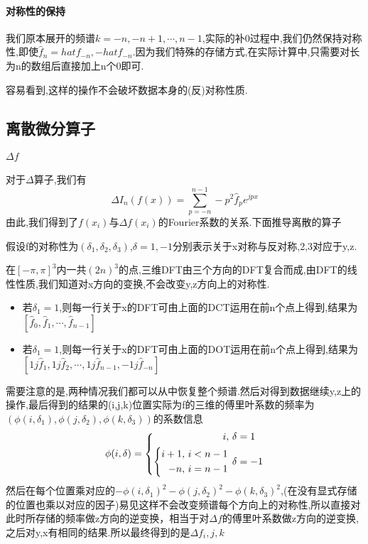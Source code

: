 \documentclass[UTF8]{ctexart}
\begin{document}
\paragraph{对称性的保持}
我们原本展开的频谱$k=-n,-n+1,\cdots,n-1$,实际的补0过程中,我们仍然保持对称性,即使$\hat{f}_n=hat{f}_{-n},-hat{f}_{-n}$.因为我们特殊的存储方式,在实际计算中,只需要对长为n的数组后直接加上n个0即可.

容易看到,这样的操作不会破坏数据本身的(反)对称性质.

\subsection{离散微分算子}
\paragraph{$\Delta f$}
对于$\Delta$算子,我们有
$$
\Delta I_n(f(x)) =  \sum\limits_{p=-n}^{n-1}-p^2\hat{f}_p e^{jpx}
$$
由此,我们得到了$f(x_i)$与$\Delta f(x_i)$的Fourier系数的关系.下面推导离散的算子

假设f的对称性为$(\delta_1,\delta_2,\delta_3)$,$\delta=1,-1$分别表示关于x对称与反对称,2,3对应于y,z.

在$[-\pi,\pi]^3$内一共$(2n)^3$的点,三维DFT由三个方向的DFT复合而成,由DFT的线性性质,我们知道对x方向的变换,不会改变y,z方向上的对称性.
\begin{itemize}
  \item 若$\delta_1=1$,则每一行关于x的DFT可由上面的DCT运用在前n个点上得到,结果为 $[\hat{f}_0,\hat{f}_1,\cdots,\hat{f}_{n-1}]$
  \item 若$\delta_1=1$,则每一行关于x的DFT可由上面的DOT运用在前n个点上得到,结果为 $[1j\hat{f}_1,1j\hat{f}_2,\cdots,1j\hat{f}_{n-1},-1j\hat{f}_{-n}]$
\end{itemize}
需要注意的是,两种情况我们都可以从中恢复整个频谱.然后对得到数据继续y,z上的操作,最后得到的结果的(i,j,k)位置实际为f的三维的傅里叶系数的频率为$(\phi(i,\delta_1),\phi(j,\delta_2),\phi(k,\delta_3))$的系数信息
\begin{equation*}
  \phi(i,\delta)=\left\{
  \begin{aligned}
     i ,&\  \delta = 1 \\\smash[]{  \left\{
     \begin{aligned}
        i+1 ,&\  i<n-1 \\
         -n ,&\  i=n-1 \\
     \end{aligned}\right.}  &\  \delta =-1 \\
  \end{aligned} \right.
\end{equation*}
然后在每个位置乘对应的$-\phi(i,\delta_1)^2-\phi(j,\delta_2)^2-\phi(k,\delta_3)^2$,(在没有显式存储的位置也乘以对应的因子)易见这样不会改变频谱每个方向上的对称性,所以直接对此时所存储的频率做z方向的逆变换，相当于对$\Delta f$的傅里叶系数做z方向的逆变换,之后对y,x有相同的结果.所以最终得到的是$\Delta f_i,j,k$
\end{document}
